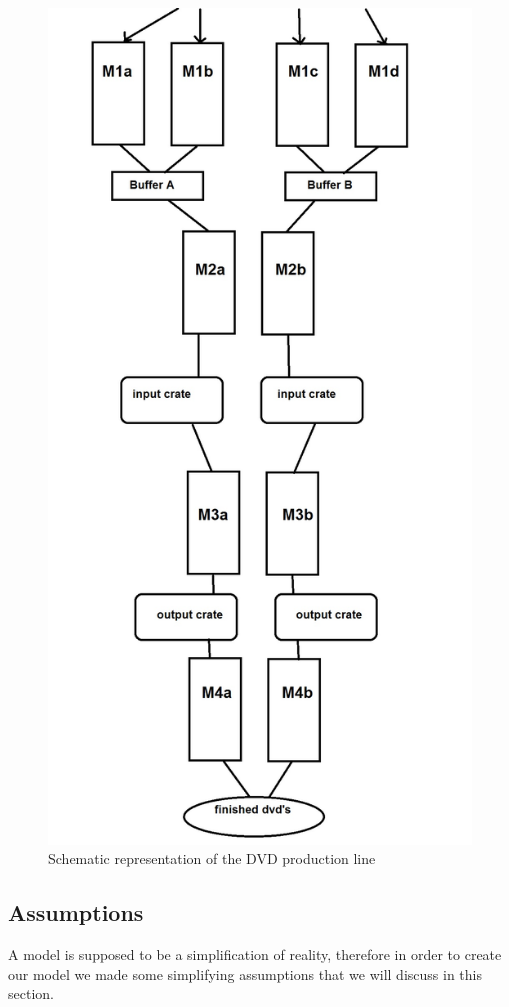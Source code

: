\documentclass[11pt,a4paper]{article}
\begin{document}
\begin{figure}
\includegraphics[width = 350 pt]{schemaPL.jpg}
\caption{Schematic representation of the DVD production line}


\end{figure}
\subsection{Assumptions}
A model is supposed to be a simplification of reality, therefore in order to create our model we made some simplifying assumptions that we will discuss in this section. 
\end{document}
